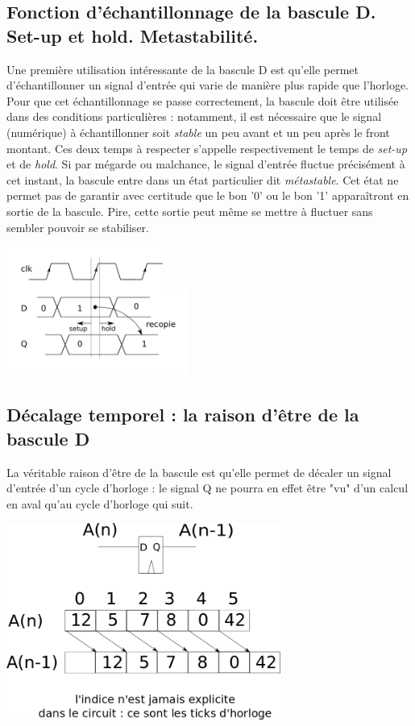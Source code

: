 \subsection{Fonction d'échantillonnage de la bascule D. Set-up et hold. Metastabilité.}
Une première utilisation intéressante de la bascule D est qu'elle permet d'échantillonner un signal d'entrée qui varie de manière plus rapide que l'horloge.
Pour que cet échantillonnage se passe correctement, la bascule doit être utilisée dans des conditions particulières : notamment, il est nécessaire que le signal (numérique)
à échantillonner soit {\it stable} un peu avant et un peu après le front montant. Ces deux temps à respecter s'appelle respectivement le temps de {\it set-up} et de {\it hold}.
Si par mégarde ou malchance, le signal d'entrée fluctue précisément à cet instant, la bascule entre dans un état particulier dit {\it métastable}. Cet état ne permet
pas de garantir avec certitude que le bon '0' ou le bon '1' apparaîtront en sortie de la bascule. Pire, cette sortie peut même se mettre à fluctuer sans sembler pouvoir
se stabiliser.

\begin{center}
  \includegraphics[width=6cm]{./figures/dff-chrono.png}
\end{center}

\subsection{Décalage temporel : la raison d'être de la bascule D}
La véritable raison d'être de la bascule est qu'elle permet de décaler un signal d'entrée d'un cycle d'horloge : le signal Q ne pourra en effet être "vu" d'un calcul en aval qu'au
cycle d'horloge qui suit.

\begin{center}
  \includegraphics[width=9cm]{./figures/DFF_decalage_temporel_timed.png}
\end{center}

